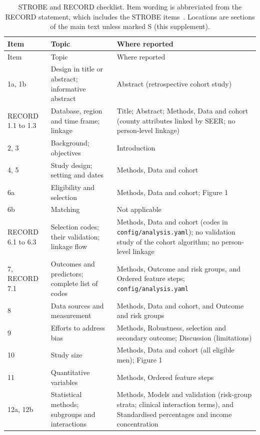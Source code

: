 \documentclass[10pt,a4paper]{article}
\begin{document}
{\footnotesize
\begin{longtable}{@{}>{\raggedright}p{2.3cm}>{\raggedright}p{5.0cm}>{\raggedright\arraybackslash}p{7.8cm}@{}}
\caption{STROBE and RECORD checklist. Item wording is abbreviated from the RECORD statement, which includes the STROBE items~\cite{strobe2007,record2015}. Locations are sections of the main text unless marked S (this supplement).}\label{tab:strobe}\\
\toprule
\rowcolor{tablehead}Item & Topic & Where reported \\
\midrule
\endfirsthead
\toprule
\rowcolor{tablehead}Item & Topic & Where reported \\
\midrule
\endhead
1a, 1b & Design in title or abstract; informative abstract & Abstract (retrospective cohort study) \\
RECORD 1.1 to 1.3 & Database, region and time frame; linkage & Title; Abstract; Methods, Data and cohort (county attributes linked by SEER; no person-level linkage) \\
2, 3 & Background; objectives & Introduction \\
4, 5 & Study design; setting and dates & Methods, Data and cohort \\
6a & Eligibility and selection & Methods, Data and cohort; Figure 1 \\
6b & Matching & Not applicable \\
RECORD 6.1 to 6.3 & Selection codes; their validation; linkage flow & Methods, Data and cohort (codes in \texttt{config/analysis.yaml}); no validation study of the cohort algorithm; no person-level linkage \\
7, RECORD 7.1 & Outcomes and predictors; complete list of codes & Methods, Outcome and risk groups, and Ordered feature steps; \texttt{config/analysis.yaml} \\
8 & Data sources and measurement & Methods, Data and cohort, and Outcome and risk groups \\
9 & Efforts to address bias & Methods, Robustness, selection and secondary outcome; Discussion (limitations) \\
10 & Study size & Methods, Data and cohort (all eligible men); Figure 1 \\
11 & Quantitative variables & Methods, Ordered feature steps \\
12a, 12b & Statistical methods; subgroups and interactions & Methods, Models and validation (risk-group strata; clinical interaction terms), and Standardised percentages and income concentration \\

\end{longtable}}
\end{document}
